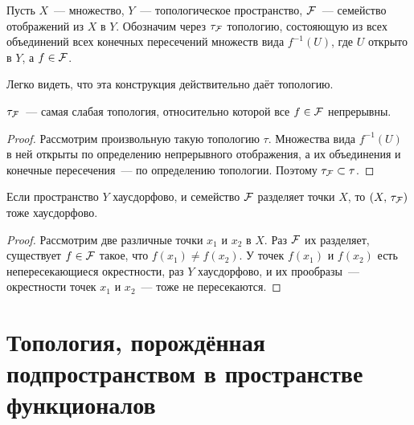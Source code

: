 \documentclass{notes}
\begin{document}
	\begin{de}
		Пусть $X$~--- множество, $Y$~--- топологическое пространство, $\mathcal{F}$~--- семейство отображений из $X$ в $Y$. Обозначим через $\tau_{\mathcal{F}}$ топологию, состояющую из всех объединений всех конечных пересечений множеств вида $f^{-1}(U)$, где $U$ открыто в $Y$, а $f \in \mathcal{F}$.
	\end{de}

	\begin{rem}
		Легко видеть, что эта конструкция действительно даёт топологию.
	\end{rem}

	\begin{st}
		$\tau_{\mathcal{F}}$~--- самая слабая топология, относительно которой все $f \in \mathcal{F}$ непрерывны.
		\begin{proof}
			Рассмотрим произвольную такую топологию $\tau$. Множества вида $f^{-1}(U)$ в ней открыты по определению непрерывного отображения, а их объединения и конечные пересечения~--- по определению топологии. Поэтому $\tau_{\mathcal{F}} \subset \tau$.
		\end{proof}
	\end{st}

	\begin{st}
		Если пространство $Y$ хаусдорфово, и семейство $\mathcal{F}$ разделяет точки $X$, то $(X, \, \tau_{\mathcal{F}})$ тоже хаусдорфово.
		\begin{proof}
			Рассмотрим две различные точки $x_1$ и $x_2$ в $X$. Раз $\mathcal{F}$ их разделяет, существует $f \in \mathcal{F}$ такое, что $f(x_1) \neq f(x_2)$. У точек $f(x_1)$ и $f(x_2)$ есть непересекающиеся окрестности, раз $Y$ хаусдорфово, и их прообразы~--- окрестности точек $x_1$ и $x_2$~--- тоже не пересекаются.
		\end{proof}
	\end{st}

\section{Топология, порождённая подпространством в пространстве функционалов}
\end{document}
